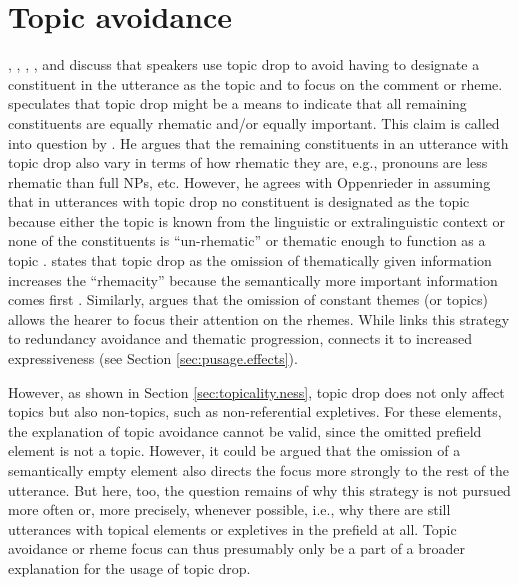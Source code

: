 \section{Topic avoidance} 
\citet{oppenrieder1987}, \citet{auer1993}, \citet{guenthner2006}, \citet{schwitalla2012}, and \citet{helmer2016} discuss that speakers use topic drop to avoid having to designate a constituent in the utterance as the topic and to focus on the comment or rheme.
\citet[179]{oppenrieder1987} speculates that topic drop might be a means to indicate that all remaining constituents are equally rhematic and/or equally important.
This claim is called into question by \citet[204]{auer1993}.
He argues that the remaining constituents in an utterance with topic drop also vary in terms of how rhematic they are, e.g., pronouns are less rhematic than full NPs, etc.
However, he agrees with Oppenrieder in assuming that in utterances with topic drop no constituent is designated as the topic because either the topic is known from the linguistic or extralinguistic context or none of the constituents is ``un-rhematic'' or thematic enough to function as a topic \citep[204]{auer1993}.
\citet[105]{guenthner2006} states that topic drop as the omission of thematically given  information increases the ``rhemacity'' because the semantically more important information comes first \citep[see also][168--169]{helmer2016}.
Similarly, \citet[103]{schwitalla2012} argues that the omission of constant themes (or topics) allows the hearer to focus their attention on the rhemes.
While \citet{helmer2016} links this strategy to redundancy avoidance and thematic progression, \citet{oppenrieder1987} connects it to increased expressiveness (see Section \ref{sec:pusage.effects}).

However, as shown in Section \ref{sec:topicality.ness}, topic drop does not only affect topics but also non-topics, such as non-referential expletives. 
For these elements, the explanation of topic avoidance cannot be valid, since the omitted prefield element is not a topic.
However, it could be argued that the omission of a semantically empty element also directs the focus more strongly to the rest of the utterance.
But here, too, the question remains of why this strategy is not pursued more often or, more precisely, whenever possible, i.e., why there are still utterances with topical elements or expletives  in the prefield at all.
Topic avoidance or rheme focus can thus presumably only be a part of a broader explanation for the usage of topic drop.


